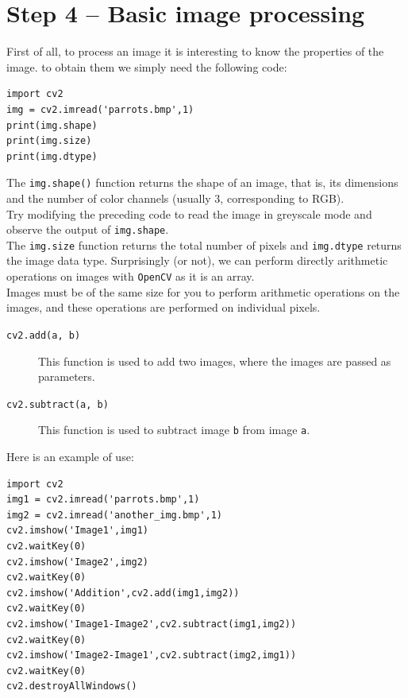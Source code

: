 \documentclass{labo}
\newcommand{\opencv}{\texttt{OpenCV} }
\begin{document}
\section*{Step 4 -- Basic image processing}
First of all, to process an image it is interesting to know the properties of the image. to obtain them we simply need the following code:

\begin{verbatim}
import cv2
img = cv2.imread('parrots.bmp',1)
print(img.shape)
print(img.size)
print(img.dtype)
\end{verbatim}

The \texttt{img.shape()} function returns the shape of an image, that is, its dimensions and the number of color channels (usually 3, corresponding to RGB).\\

Try modifying the preceding code to read the image in greyscale mode and observe the output of \texttt{img.shape}.\\

The \texttt{img.size} function returns the total number of pixels and \texttt{img.dtype} returns the image data type.
Surprisingly (or not), we can perform directly arithmetic operations on images with \opencv as it is an array.\\

Images must be of the same size for you to perform arithmetic operations on the images, and these operations are performed on individual pixels.

\begin{description}
	\item[\texttt{cv2.add(a, b)}] This function is used to add two images, where the images are passed as parameters.
	\item[\texttt{cv2.subtract(a, b)}] This function is used to subtract image \texttt{b} from image \texttt{a}.
\end{description}

Here is an example of use:
\begin{verbatim}
import cv2
img1 = cv2.imread('parrots.bmp',1)
img2 = cv2.imread('another_img.bmp',1)
cv2.imshow('Image1',img1)
cv2.waitKey(0)
cv2.imshow('Image2',img2)
cv2.waitKey(0)
cv2.imshow('Addition',cv2.add(img1,img2))
cv2.waitKey(0)
cv2.imshow('Image1-Image2',cv2.subtract(img1,img2))
cv2.waitKey(0)
cv2.imshow('Image2-Image1',cv2.subtract(img2,img1))
cv2.waitKey(0)
cv2.destroyAllWindows()
\end{verbatim}
\end{document}
